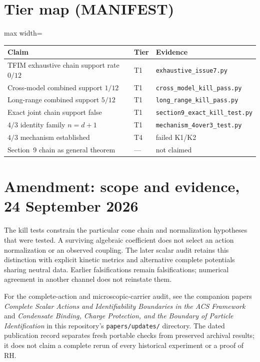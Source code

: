 \documentclass[11pt]{article}
\begin{document}
\section*{Tier map (MANIFEST)}

\begin{center}
\begin{adjustbox}{max width=\linewidth}\begin{tabular}{lll}
\toprule
Claim & Tier & Evidence \\
\midrule
TFIM exhaustive chain support rate $0/12$ & T1 & \texttt{exhaustive\_issue7.py} \\
Cross-model combined support $1/12$ & T1 & \nolinkurl{cross_model_kill_pass.py} \\
Long-range combined support $5/12$ & T1 & \texttt{long\_range\_kill\_pass.py} \\
Exact joint chain support false & T1 & \nolinkurl{section9_exact_kill_test.py} \\
$4/3$ identity family $n=d+1$ & T1 & \texttt{mechanism\_4over3\_test.py} \\
$4/3$ mechanism established & T4 & failed K1/K2 \\
Section~9 chain as general theorem & --- & not claimed \\
\bottomrule
\end{tabular}\end{adjustbox}
\end{center}


\section*{Amendment: scope and evidence, 24 September 2026}
The kill tests constrain the particular cone chain and normalization hypotheses that were tested. A surviving algebraic coefficient does not select an action normalization or an observed coupling. The later scalar audit retains this distinction with explicit kinetic metrics and alternative complete potentials sharing neutral data. Earlier falsifications remain falsifications; numerical agreement in another channel does not reinstate them.

For the complete-action and microscopic-carrier audit, see the companion
papers \emph{Complete Scalar Actions and Identifiability Boundaries in the ACS
Framework} and \emph{Condensate Binding, Charge Protection, and the Boundary
of Particle Identification} in this repository's \texttt{papers/updates/}
directory. The dated publication record separates fresh portable checks
from preserved archival results; it does not claim a complete rerun of every
historical experiment or a proof of RH.
\end{document}
